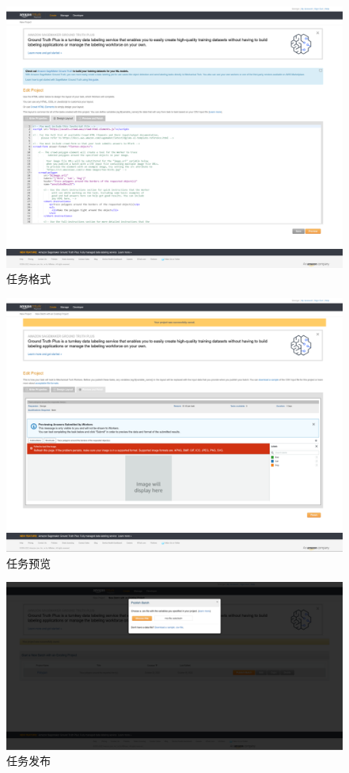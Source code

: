 \begin{figure}[h!]
    \centering
    \includegraphics[width=0.7\linewidth]{imgs/mturk/layout.png}
    \caption{任务格式}
    \label{fig:layout}
\end{figure}

\begin{figure}[h!]
    \centering
    \includegraphics[width=0.7\linewidth]{imgs/mturk/preview.png}
    \caption{任务预览}
    \label{fig:preview}
\end{figure}

\newpage

\begin{figure}[h!]
    \centering
    \includegraphics[width=\linewidth]{imgs/mturk/publish.png}
    \caption{任务发布}
    \label{fig:publish}
\end{figure}